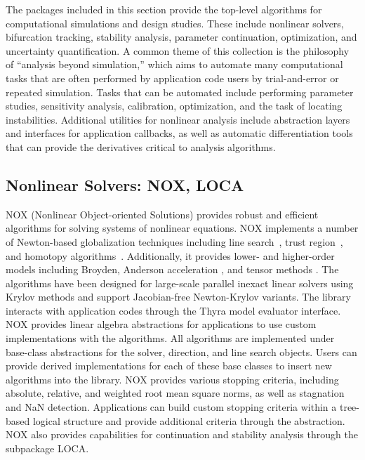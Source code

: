 
The packages included in this section provide the top-level algorithms for computational simulations and design studies.
These include nonlinear solvers, bifurcation tracking, stability analysis, parameter continuation, optimization, and uncertainty quantification.
A common theme of this collection is the philosophy of ``analysis beyond simulation,'' which aims to automate many computational tasks that are often performed by application code users by trial-and-error or repeated simulation. Tasks that can be automated include performing parameter studies, sensitivity analysis, calibration, optimization, and the task of locating instabilities.
Additional utilities for nonlinear analysis include abstraction layers and interfaces for application callbacks, as well as automatic differentiation tools that can provide the derivatives critical to analysis algorithms.

\subsection{Nonlinear Solvers: NOX, LOCA} \label{sec:nox}
NOX (Nonlinear Object-oriented Solutions) provides robust and efficient algorithms for solving systems of nonlinear equations.
NOX implements a number of Newton-based globalization techniques including line search~\cite{Pawlowski2006}, trust region~\cite{Pawlowski2006,Pawlowski2008}, and homotopy algorithms~\cite{Coffey2003}.
Additionally, it provides lower- and higher-order models including Broyden, Anderson acceleration \cite{Walker2011}, and tensor methods \cite{Bader2005}.
The algorithms have been designed for large-scale parallel inexact linear solvers using Krylov methods and support Jacobian-free Newton-Krylov variants.
The library interacts with application codes through the Thyra model evaluator interface.
NOX provides linear algebra abstractions for applications to use custom implementations with the algorithms.
All algorithms are implemented under base-class abstractions for the solver, direction, and line search objects.
Users can provide derived implementations for each of these base classes to insert new algorithms into the library.
NOX provides various stopping criteria, including absolute, relative, and weighted root mean square norms, as well as stagnation and NaN detection.
Applications can build custom stopping criteria within a tree-based logical structure and provide additional criteria through the  abstraction.
NOX also provides capabilities for continuation and stability analysis through the subpackage LOCA.

